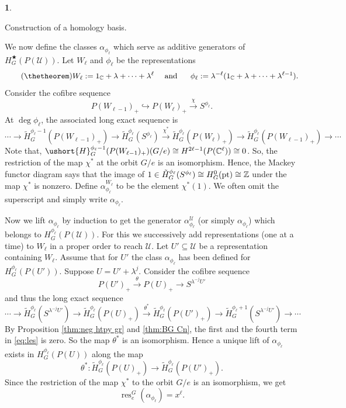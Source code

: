 \documentclass[a4paper,leqno,11pt]{amsart}
\theoremstyle{plain}
\theoremstyle{definition}
\newtheorem{subsec}[theorem]{}
\theoremstyle{remark}
\theoremstyle{definition}
\newcommand{\C}{{\mathbb C}}
\newcommand{\Z}{{\mathbb{Z}}}
\newcommand{\ra}{\rightarrow}
\newenvironment{myeq}[1][]
{\stepcounter{theorem}\begin{equation}\tag{\thetheorem}{#1}}
	{\end{equation}}
\newenvironment{mysubsection}[2][]
{\begin{subsec}\begin{upshape}\begin{bfseries}{#2.}
			\end{bfseries}{#1}}
		{\end{upshape}\end{subsec}}
\newcommand{\res}{\mathit{res}}
\newcommand{\uH}{\ushort{H}}
\def\Z{\mathbb{Z}}
\def\a{\alpha}
\def\lam{\lambda}
\def\sU{\mathcal{U}}
\def\C{\mathbb{C}}
\def\ra{\rightarrow}
\def\xra{\xrightarrow}
\numberwithin{equation}{section}
\def\tH{\tilde{H}}
\newcommand{\pt}{\textup{pt}}
\renewcommand{\res}{\operatorname{res}}
\begin{document}
	\begin{mysubsection}{Construction of a homology basis}\label{cons:alpha phi d}
We now define the classes $ \alpha_{\phi_\ell} $  which  serve as additive generators of $ H^{\bigstar}_{G}(P(\sU)) $.
		Let $ W_\ell$  and $ \phi_\ell $ be the representations
		\begin{myeq}\label{eq:phi d}
			W_\ell:=1_\C+\lambda+\cdots+\lambda^{\ell} \quad \textup{~and ~} \quad \phi_\ell:=\lambda^{-\ell}(1_\C+\lambda+\cdots+\lambda^{\ell-1}).
		\end{myeq}
		Consider the cofibre sequence 
		$$
		P(W_{\ell-1})_+\hookrightarrow P(W_\ell)_+ \xra{\chi}S^{\phi_\ell}.
		$$
		At $ \deg \phi_\ell $, the associated long exact sequence  is 
		$$
		\cdots \to \tH^{\phi_{\ell}-1}_{G}(P(W_{\ell-1})_+)\ra \tH^{\phi_\ell}_{G}(S^{\phi_\ell})\xra{\chi^*} \tH^{\phi_\ell}_{G}(P(W_\ell)_+)\ra  \tH^{\phi_\ell}_{G}(P(W_{ \ell-1})_+)\ra \cdots $$
		Note that, $ \uH^{\phi_{\ell}-1}_{G}(P(W_{\ell-1})_+)(G/e) \cong H^{2\ell-1}( P({\C^\ell}))\cong 0$.
		So, the  restriction of the map $ \chi^* $ at the orbit $ G/e $ is an isomorphism. Hence, the Mackey functor diagram says that the image of $ 1\in \tH^{\phi_\ell}_{G}(S^{\phi_\ell})\cong  H^{0}_{G}(\pt) \cong \Z  $ under the map $ \chi^* $ is nonzero. Define $ \alpha_{\phi_\ell}^{W_\ell} $  to be the element $ \chi^*(1) $. We often omit the superscript  and simply write  $ \alpha_{\phi_\ell} $.\par
		Now we lift  $\a_{\phi_\ell}$ by induction to get the  generator  $ \alpha_{\phi_\ell}^\mathcal{U} $ (or simply $ \alpha_{\phi_\ell} $) which belongs to  $ H^{\phi_\ell}_{G}(P(\sU)) $. For this we successively add representations (one at a time)  to $ W_\ell $ in a proper order to reach $ \mathcal{ U} $.  Let $ U' \subseteq \mathcal{U}$ be a representation containing $ W_\ell $. Assume that for  $U'$ the class $\alpha_{\phi_\ell}$ has been defined for $H^{\phi_\ell}_{G}(P(U'))$. Suppose $ U=U'+\lambda^j $.
		Consider the cofibre sequence $$P(U')_+ \xrightarrow{\theta}P(U)_+\rightarrow S^{\lam^{-j} U'}$$  and thus the long exact sequence
		\begin{myeq}\label{eq:les}
			\cdots\ra \tH^{\phi_\ell}_G(S^{\lam^{-j} U'})\ra \tH^{\phi_\ell}_G(P(U)_+)\xra{\theta^*}\tH^{\phi_\ell }_G(P(U')_+)\ra \tH^{\phi_\ell +1}_{G}(S^{\lam^{-j} U'})\to\cdots
		\end{myeq}
		By Proposition   \ref{thm:neg htpy gr} and \ref{thm:BG Cn}, the first and the fourth term in \ref{eq:les} is zero. So the map $ \theta^* $ is an isomorphism. Hence a unique lift of $\a_{\phi_\ell}$ exists in $H^{\phi_\ell}_{G}(P(U))$ along the map 
		$$\theta^*:\tH^{\phi_\ell}_{G}(P(U)_+)\ra \tH^{\phi_\ell}_{G}(P(U')_+).
		$$
		Since the restriction of the map $ \chi^* $ to the orbit $ G/e $  is an isomorphism, we get 
		\begin{myeq}\label{eq:res g/e}
			\res^{G}_e(\alpha_{\phi_\ell})=x^{\ell}.
		\end{myeq}
	\end{mysubsection}
\end{document}
